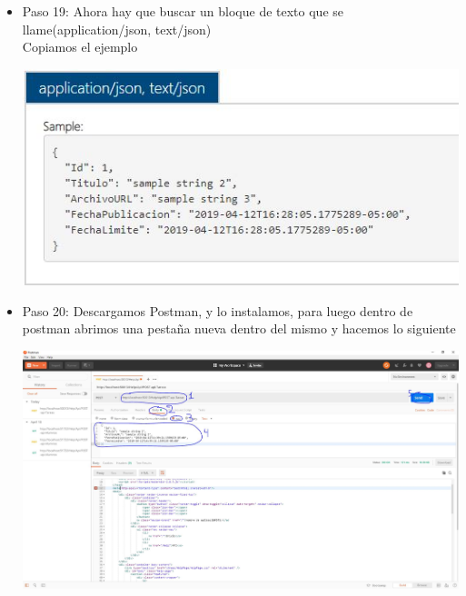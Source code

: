 \begin{itemize}
	\item Paso 19: Ahora hay que buscar un bloque de texto que se llame(application/json, text/json)\\
	Copiamos el ejemplo\\
	\begin{center}
		\includegraphics[width=15cm]{./Imagenes/Captura21}
	\end{center}
	\newpage
	\item Paso 20: Descargamos Postman, y lo instalamos, para luego dentro de postman abrimos una pestaña nueva dentro del mismo y hacemos lo siguiente\\
	\begin{center}
		\includegraphics[width=15cm]{./Imagenes/Captura22}
	\end{center}
	
	
	
\end{itemize}





